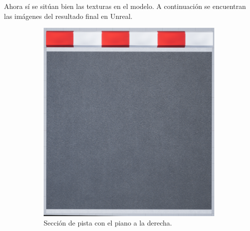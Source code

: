 Ahora sí se sitúan bien las texturas en el modelo. A continuación se encuentran las imágenes del resultado final en Unreal.

\begin{figure}[H]
    \centering
    \begin{subfigure}[t]{0.48\textwidth}
        \centering
        \includegraphics[width=\textwidth]{imagenes/pista/track-final.png}
        \caption{Sección de pista con el piano a la derecha.}
        \label{fig:curvafinal2}
    \end{subfigure}
    \hfill
    \begin{subfigure}[t]{0.48\textwidth}
        \centering

\end{subfigure}
\end{figure}
